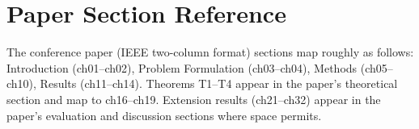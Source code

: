 \section{Paper Section Reference}

The conference paper (IEEE two-column format) sections map roughly as follows: Introduction (ch01--ch02), Problem Formulation (ch03--ch04), Methods (ch05--ch10), Results (ch11--ch14). Theorems T1--T4 appear in the paper's theoretical section and map to ch16--ch19. Extension results (ch21--ch32) appear in the paper's evaluation and discussion sections where space permits.
